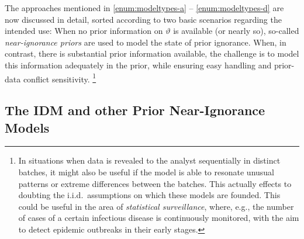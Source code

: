 The approaches mentioned in \eqref{enum:modeltypes-a} -- \eqref{enum:modeltypes-d} are now discussed in detail,
sorted according to two basic scenarios regarding the intended use:
When no prior information on $\vartheta$ is available (or nearly so),
so-called \emph{near-ignorance priors} are used to model the state of prior ignorance.
When, in contrast, there is substantial prior information available,
the challenge is to model this information adequately in the prior,
while ensuring easy handling and prior-data conflict sensitivity.%
\footnote{In situations when data is revealed to the analyst sequentially in distinct batches,
it might also be useful if the model is able to resonate unusual patterns or extreme differences between the batches.
This actually effects to doubting the i.i.d.\ assumptions on which these models are founded.
This could be useful in the area of \emph{statistical surveillance},
where, e.g., the number of cases of a certain infectious disease is continuously monitored,
with the aim to detect epidemic outbreaks in their early stages.}


\subsection{The IDM and other Prior Near-Ignorance Models}
\label{sec:idm-and-near-ignorance}

